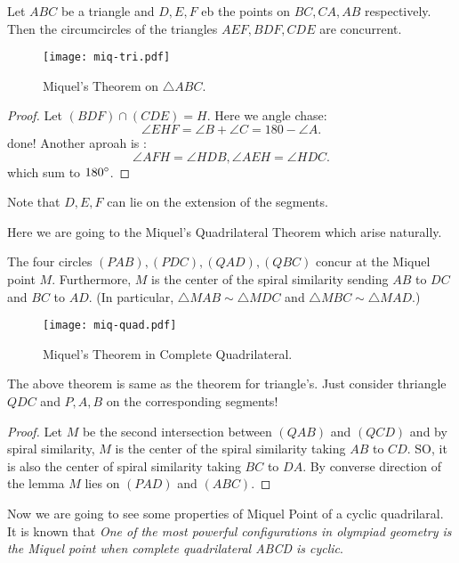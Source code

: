 \begin{theorem}
Let $ABC$ be a triangle and $D,E,F$ eb the points on $BC,CA,AB$ respectively. Then the circumcircles of the triangles $AEF, BDF, CDE$ are concurrent.
\end{theorem}
\begin{figure}[ht]
\centering
	\texttt{[image: miq-tri.pdf]}
	\caption{Miquel's Theorem on $\triangle ABC$.}
\end{figure}
\begin{proof}
Let $(BDF) \cap (CDE)=H$.
Here we angle chase:
\[\angle EHF=\angle B +\angle C = 180 -\angle A.\]
done!
Another aproah is :
\[\angle AFH = \angle HDB, \angle AEH =\angle HDC.\]
which sum to $180^\circ$.
\end{proof}
Note that $D,E,F$ can lie on the extension of the segments.


Here we are going to the Miquel's Quadrilateral Theorem which arise naturally.

\begin{theorem}
The four circles $(PAB), (PDC), (QAD), (QBC)$
concur at the Miquel point $M$. Furthermore, 
$M$ is the center of the spiral similarity sending
$AB$ to $DC$ and $BC$ to $AD$. (In particular,
 $ \triangle MAB \sim \triangle MDC$ and $\triangle MBC \sim \triangle MAD.$)
\end{theorem}
\begin{figure}[ht]
\centering
	\texttt{[image: miq-quad.pdf]}
	\caption{Miquel's Theorem in Complete Quadrilateral.}
\end{figure}
The above theorem is same as the theorem for triangle's. Just consider thriangle $QDC$ and $P,A,B$ on the corresponding segments!

\begin{proof}
Let $M$ be the second intersection between $(QAB)$ and $(QCD)$ and by spiral similarity, $M$ is the center of the spiral similarity taking $AB$ to $CD$. SO, it is also the center of spiral similarity taking $BC$ to $DA$. By converse direction of the lemma $M$ lies on $(PAD)$ and $(ABC)$.
\end{proof}

Now we are going to see some properties of Miquel Point of a cyclic quadrilaral. It is known that \textit{One of the most powerful configurations in olympiad geometry is the Miquel point when
complete quadrilateral ABCD is cyclic}.


